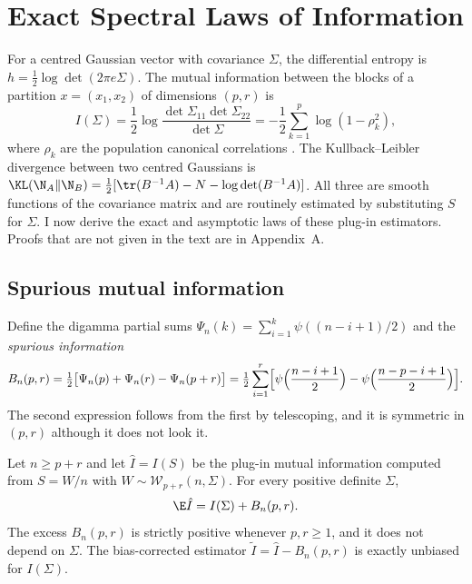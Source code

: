 \section*{Exact Spectral Laws of Information}

For a centred Gaussian vector with covariance $\Sigma$, the differential entropy is $h=\tfrac12\log\det(2\pi e\Sigma)$. The mutual information between the blocks of a partition $x=(x_1,x_2)$ of dimensions $(p,r)$ is
\[
 I(\Sigma)=\frac12\log\frac{\det\Sigma_{11}\det\Sigma_{22}}{\det\Sigma}
 =-\frac12\sum_{k=1}^{p}\log(1-\rho_k^2),
\]
where $\rho_k$ are the population canonical correlations \citep{cover2006elements}. The Kullback--Leibler divergence between two centred Gaussians is $\KL(\N_A\|\N_B)=\tfrac12[\tr(B^{-1}A)-N-\log\det(B^{-1}A)]$. All three are smooth functions of the covariance matrix and are routinely estimated by substituting $S$ for $\Sigma$. I now derive the exact and asymptotic laws of these plug-in estimators. Proofs that are not given in the text are in Appendix~A.

\subsection*{Spurious mutual information}

Define the digamma partial sums $\Psi_n(k)=\sum_{i=1}^k\psi((n-i+1)/2)$ and the \emph{spurious information}
\begin{equation}
 B_n(p,r)=\tfrac12\bigl[\Psi_n(p)+\Psi_n(r)-\Psi_n(p+r)\bigr]
 =\tfrac12\sum_{i=1}^{r}\Bigl[\psi\Bigl(\frac{n-i+1}2\Bigr)-\psi\Bigl(\frac{n-p-i+1}2\Bigr)\Bigr].
 \label{eq:spurious}
\end{equation}
The second expression follows from the first by telescoping, and it is symmetric in $(p,r)$ although it does not look it.

\begin{proposition*}
Let $n\geq p+r$ and let $\hat I=I(S)$ be the plug-in mutual information computed from $S=W/n$ with $W\sim\mathcal W_{p+r}(n,\Sigma)$. For every positive definite $\Sigma$,
\[
 \E\hat I=I(\Sigma)+B_n(p,r).
\]
The excess $B_n(p,r)$ is strictly positive whenever $p,r\geq1$, and it does not depend on $\Sigma$. The bias-corrected estimator $\tilde I=\hat I-B_n(p,r)$ is exactly unbiased for $I(\Sigma)$.
\end{proposition*}


